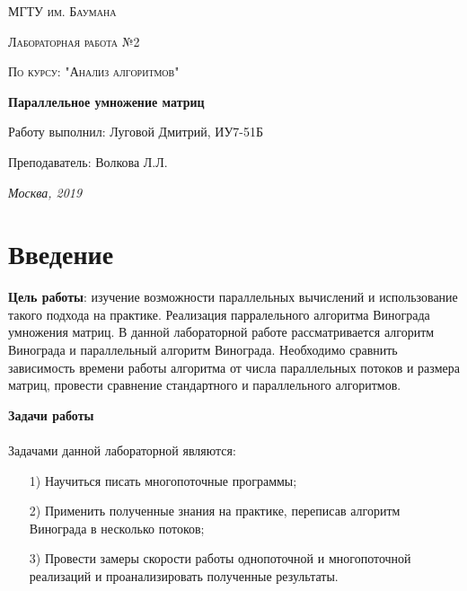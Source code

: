 \documentclass[a4paper,12pt]{report}
\begin{document}
\begin{titlepage}
	\centering
	{\scshape\LARGE МГТУ им. Баумана \par}
	\vspace{4cm}
	{\scshape\Large Лабораторная работа №2\par}
	\vspace{0.5cm}	
	{\scshape\Large По курсу: "Анализ алгоритмов"\par}
	\vspace{2cm}
	{\huge\bfseries Параллельное умножение матриц\par}
	\vspace{3cm}
	\Large Работу выполнил: Луговой Дмитрий, ИУ7-51Б\par
	\vspace{0.5cm}
	\Large Преподаватель:  Волкова Л.Л.\par

	\vfill
	\large \textit {Москва, 2019} \par
\end{titlepage}

\setcounter{page}{2}

\tableofcontents

\newpage
\chapter*{Введение}
\hspace{0.6cm} \textbf{Цель работы}: изучение возможности параллельных вычислений и использование такого подхода на практике. Реализация парралельного алгоритма Винограда умножения матриц. 
В данной лабораторной работе рассматривается алгоритм Винограда и параллельный алгоритм Винограда. Необходимо сравнить зависимость времени работы алгоритма от числа параллельных потоков и размера матриц, провести сравнение стандартного и параллельного алгоритмов.

\textbf{\LARGE Задачи работы}\\\\
Задачами данной лабораторной являются:
\begin{enumerate}
\item[1)] Научиться писать многопоточные программы;
\item[2)] Применить полученные знания на практике, переписав алгоритм Винограда в несколько потоков;
\item[3)] Провести замеры скорости работы однопоточной и многопоточной реализаций и проанализировать полученные результаты.
\end{enumerate}
\end{document}
